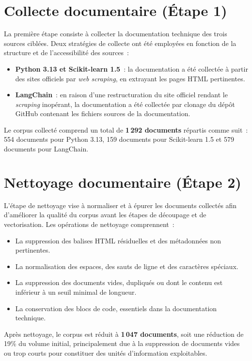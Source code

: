 \documentclass[12pt,a4paper,oneside]{report}
\begin{document}
\section{Collecte documentaire (Étape 1)}
\label{sec:collecte}

La première étape consiste à collecter la documentation technique des trois sources ciblées. Deux stratégies de collecte ont été employées en fonction de la structure et de l'accessibilité des sources~:

\begin{itemize}
  \item \textbf{Python 3.13 et Scikit-learn 1.5}~: la documentation a été collectée à partir des sites officiels par \textit{web scraping}, en extrayant les pages HTML pertinentes.
  \item \textbf{LangChain}~: en raison d'une restructuration du site officiel rendant le \textit{scraping} inopérant, la documentation a été collectée par clonage du dépôt GitHub contenant les fichiers sources de la documentation.
\end{itemize}

Le corpus collecté comprend un total de \textbf{1\,292 documents} répartis comme suit~: 554 documents pour Python 3.13, 159 documents pour Scikit-learn 1.5 et 579 documents pour LangChain.

\section{Nettoyage documentaire (Étape 2)}
\label{sec:nettoyage}

L'étape de nettoyage vise à normaliser et à épurer les documents collectés afin d'améliorer la qualité du corpus avant les étapes de découpage et de vectorisation. Les opérations de nettoyage comprennent~:

\begin{itemize}[nosep]
  \item La suppression des balises HTML résiduelles et des métadonnées non pertinentes.
  \item La normalisation des espaces, des sauts de ligne et des caractères spéciaux.
  \item La suppression des documents vides, dupliqués ou dont le contenu est inférieur à un seuil minimal de longueur.
  \item La conservation des blocs de code, essentiels dans la documentation technique.
\end{itemize}

Après nettoyage, le corpus est réduit à \textbf{1\,047 documents}, soit une réduction de 19\% du volume initial, principalement due à la suppression de documents vides ou trop courts pour constituer des unités d'information exploitables.
\end{document}
